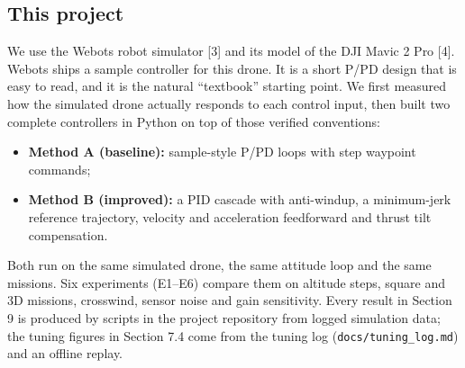 \subsection{This project}
We use the Webots robot simulator [3] and its model of the DJI Mavic 2 Pro [4]. Webots ships a sample controller for this drone. It is a short P/PD design that is easy to read, and it is the natural ``textbook'' starting point. We first measured how the simulated drone actually responds to each control input, then built two complete controllers in Python on top of those verified conventions:
\begin{itemize}[itemsep=0pt,topsep=2pt]
\item \textbf{Method A (baseline):} sample-style P/PD loops with step waypoint commands;
\item \textbf{Method B (improved):} a PID cascade with anti-windup, a minimum-jerk reference trajectory, velocity and acceleration feedforward and thrust tilt compensation.
\end{itemize}
Both run on the same simulated drone, the same attitude loop and the same missions. Six experiments (E1--E6) compare them on altitude steps, square and 3D missions, crosswind, sensor noise and gain sensitivity. Every result in Section 9 is produced by scripts in the project repository from logged simulation data; the tuning figures in Section 7.4 come from the tuning log (\texttt{docs/tuning\_log.md}) and an offline replay.
